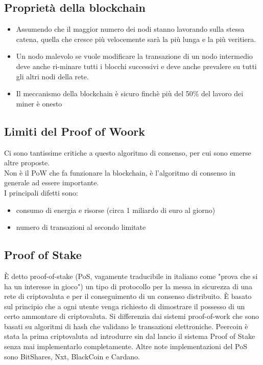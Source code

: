 \subsection{Proprietà della blockchain}
\begin{itemize}
    \item Assumendo che il maggior numero dei nodi stanno lavorando sulla stessa catena, quella che cresce più velocemente sarà la più lunga e la più veritiera.
    \item Un nodo malevolo se vuole modificare la transazione di un nodo intermedio deve anche ri-minare tutti i blocchi successivi e deve anche prevalere su tutti gli altri nodi della rete.
    \item Il meccanismo della blockchain è sicuro finchè più del 50\% del lavoro dei miner è onesto
\end{itemize}

\subsection{Limiti del Proof of Woork}
Ci sono tantissime critiche a questo algoritmo di consenso, per cui sono emerse altre proposte. \\
Non è il PoW che fa funzionare la blockchain, è l'algoritmo di consenso in generale ad essere importante.\\
I principali difetti sono:
\begin{itemize}
    \item consumo di energia e risorse (circa 1 miliardo di euro al giorno)
    \item numero di transazioni al secondo limitate
\end{itemize}

\subsection{Proof of Stake}
È detto proof-of-stake (PoS, vagamente traducibile in italiano come "prova che si ha un interesse in gioco") un tipo di protocollo per la messa in sicurezza di una rete di criptovaluta e per il conseguimento di un consenso distribuito. È basato sul principio che a ogni utente venga richiesto di dimostrare il possesso di un certo ammontare di criptovaluta. Si differenzia dai sistemi proof-of-work che sono basati su algoritmi di hash che validano le transazioni elettroniche. Peercoin è stata la prima criptovaluta ad introdurre sin dal lancio il sistema Proof of Stake senza mai implementarlo completamente. Altre note implementazioni del PoS sono BitShares, Nxt, BlackCoin e Cardano.

